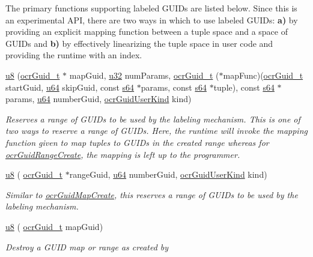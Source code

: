 The primary functions supporting labeled GUIDs are listed below. Since
this is an experimental API, there are two ways in which to use
labeled GUIDs: {\bf a)} by providing an explicit mapping function
between a tuple space and a space of GUIDs and {\bf b)} by effectively
linearizing the tuple space in user code and providing the runtime
with an index.
\begin{DoxyCompactItemize}
\item
  \hyperlink{type_u8}{u8} \hyperlink{func_ocrGuidMapCreate}
  {}(\hyperlink{type_ocrGuid_t}{ocr\-Guid\-\_\-t}
  $\ast$ mapGuid,
  \hyperlink{type_u32}{u32} numParams,
  \hyperlink{type_ocrGuid_t}{ocr\-Guid\-\_\-t}
  ($\ast$mapFunc)(\hyperlink{type_ocrGuid_t}{ocr\-Guid\-\_\-t}
      startGuid, \hyperlink{type_u64}{u64} skipGuid,
      const \hyperlink{type_s64}{s64} $\ast$params,
      const \hyperlink{type_s64}{s64} $\ast$tuple),
  const \hyperlink{type_s64}{s64} $\ast$params,
  \hyperlink{type_u64}{u64} numberGuid,
  \hyperlink{type_ocrGuidUserKind}{ocrGuidUserKind} kind)
  \begin{DoxyCompactList}
    \small \item \emph{Reserves a range of GUIDs to be used by the
      labeling mechanism. This is one of two ways to reserve a range
      of GUIDs. Here, the runtime will invoke the mapping function
      given to map tuples to GUIDs in the created range whereas for
      \hyperlink{func_ocrGuidRangeCreate}{ocrGuidRangeCreate}, the mapping is left up to
      the programmer.}
  \end{DoxyCompactList}
\item
  \hyperlink{type_u8}{u8}
  \hyperlink{func_ocrGuidRangeCreate}{}(
  \hyperlink{type_ocrGuid_t}{ocr\-Guid\-\_\-t} $\ast$rangeGuid,
  \hyperlink{type_u64}{u64} numberGuid,
  \hyperlink{type_ocrGuidUserKind}{ocrGuidUserKind} kind)
  \begin{DoxyCompactList}
    \small \item \emph{Similar to \hyperlink{func_ocrGuidMapCreate}{ocrGuidMapCreate},
      this reserves a range of GUIDs to be used by the labeling
      mechanism.}
  \end{DoxyCompactList}
\item
  \hyperlink{type_u8}{u8}
  \hyperlink{func_ocrGuidMapDestroy}{}(
  \hyperlink{type_ocrGuid_t}{ocr\-Guid\-\_\-t} mapGuid)
  \begin{DoxyCompactList}
    \small \item \emph{Destroy a GUID map or range as created by
}
\end{DoxyCompactList}
\end{DoxyCompactItemize}
